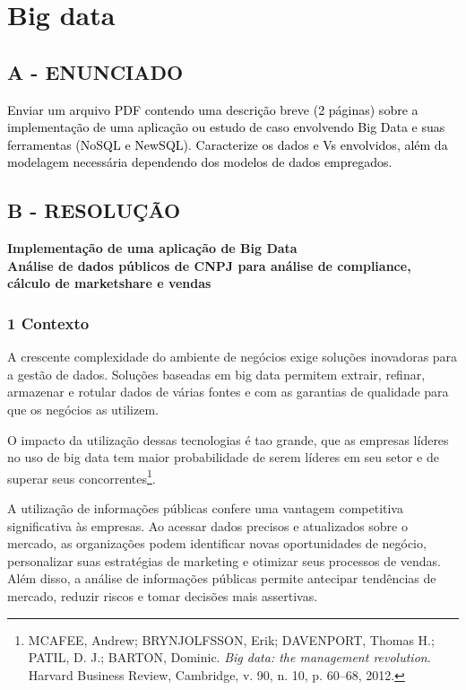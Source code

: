 \label{ap:ap10}
\chapter{Big data}
\section*{\textbf{A - ENUNCIADO}}

\textcolor{black}{Enviar um arquivo PDF contendo uma descrição breve (2 páginas) sobre a implementação de uma aplicação
ou estudo de caso envolvendo Big Data e suas ferramentas (NoSQL e NewSQL). Caracterize os dados e Vs envolvidos, além
da modelagem necessária dependendo dos modelos de dados empregados.}

\section*{\textbf{B - RESOLUÇÃO}}

\begin{center}
\textbf{\large Implementação de uma aplicação de Big Data} \\[0.5em]
\textbf{Análise de dados públicos de CNPJ para análise de compliance, cálculo de marketshare e vendas}
\end{center}

\subsection*{\textbf{1 Contexto}}

A crescente complexidade do ambiente de negócios exige soluções inovadoras para a gestão de dados. Soluções baseadas em big data permitem extrair, refinar, armazenar e rotular dados de várias fontes e com as garantias de qualidade para que os negócios as utilizem.

O impacto da utilização dessas tecnologias é tao grande, que as empresas líderes no uso de big data tem maior probabilidade de serem líderes em seu setor e de superar seus concorrentes\footnote{MCAFEE, Andrew; BRYNJOLFSSON, Erik; DAVENPORT, Thomas H.; PATIL, D. J.; BARTON, Dominic. \textit{Big data: the management revolution}. Harvard Business Review, Cambridge, v. 90, n. 10, p. 60–68, 2012.}. 

A utilização de informações públicas confere uma vantagem competitiva significativa às empresas. Ao acessar dados precisos e atualizados sobre o mercado, as organizações podem identificar novas oportunidades de negócio, personalizar suas estratégias de marketing e otimizar seus processos de vendas. Além disso, a análise de informações públicas permite antecipar tendências de mercado, reduzir riscos e tomar decisões mais assertivas.

